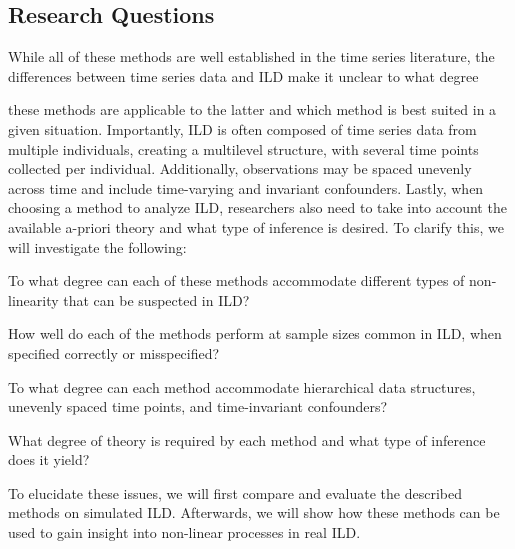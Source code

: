 
\subsection{Research Questions}

While all of these methods are well established in the time series literature,
the differences between time series data and ILD make it unclear to what degree

these methods are applicable to the latter and which method is best suited in a
given
situation. Importantly, ILD is often composed of time series data from multiple
individuals,
creating a multilevel structure, with several time points collected per
individual.
Additionally, observations may be spaced unevenly across time and include
time-varying
and invariant confounders. Lastly, when choosing a method to analyze ILD,
researchers
also need to take into account the available a-priori theory and what type of
inference
is desired. To clarify this, we will investigate the following:

\begin{APAitemize}
    \item To what degree can each of these methods accommodate different types
    of non-linearity that can be suspected in ILD?
    \item How well do each of the methods perform at sample sizes common in
    ILD, when specified correctly or misspecified?
    \item To what degree can each method accommodate hierarchical data
    structures, unevenly spaced time points, and time-invariant confounders?
    \item What degree of theory is required by each method and what type of
    inference does it yield?
\end{APAitemize}

To elucidate these issues, we will first compare and evaluate the described
methods on
simulated ILD. Afterwards, we will show how these methods can be used to gain
insight
into non-linear processes in real ILD.
